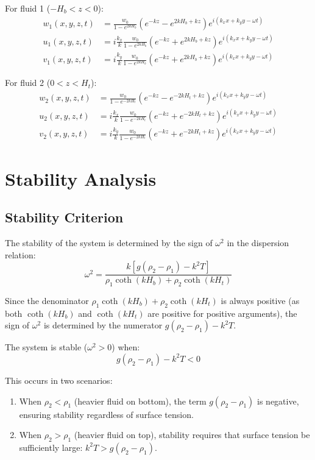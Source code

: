 \documentclass[12pt,a4paper]{article}
\begin{document}
For fluid 1 ($-H_b < z < 0$):
\begin{align}
w_1(x,y,z,t) &= \frac{w_0}{1 - e^{2kH_b}}(e^{-kz} - e^{2kH_b+kz})e^{i(k_xx + k_yy - \omega t)} \\
u_1(x,y,z,t) &= i\frac{k_x}{k}\frac{w_0}{1 - e^{2kH_b}}(e^{-kz} + e^{2kH_b+kz})e^{i(k_xx + k_yy - \omega t)} \\
v_1(x,y,z,t) &= i\frac{k_y}{k}\frac{w_0}{1 - e^{2kH_b}}(e^{-kz} + e^{2kH_b+kz})e^{i(k_xx + k_yy - \omega t)}
\end{align}

For fluid 2 ($0 < z < H_t$):
\begin{align}
w_2(x,y,z,t) &= \frac{w_0}{1 - e^{-2kH_t}}(e^{-kz} - e^{-2kH_t+kz})e^{i(k_xx + k_yy - \omega t)} \\
u_2(x,y,z,t) &= i\frac{k_x}{k}\frac{w_0}{1 - e^{-2kH_t}}(e^{-kz} + e^{-2kH_t+kz})e^{i(k_xx + k_yy - \omega t)} \\
v_2(x,y,z,t) &= i\frac{k_y}{k}\frac{w_0}{1 - e^{-2kH_t}}(e^{-kz} + e^{-2kH_t+kz})e^{i(k_xx + k_yy - \omega t)}
\end{align}

\section{Stability Analysis}
\subsection{Stability Criterion}
The stability of the system is determined by the sign of $\omega^2$ in the dispersion relation:
\begin{equation}
\omega^2 = \frac{k[g(\rho_2 - \rho_1) - k^2T]}{\rho_1\coth(kH_b) + \rho_2\coth(kH_t)}
\end{equation}

Since the denominator $\rho_1\coth(kH_b) + \rho_2\coth(kH_t)$ is always positive (as both $\coth(kH_b)$ and $\coth(kH_t)$ are positive for positive arguments), the sign of $\omega^2$ is determined by the numerator $g(\rho_2 - \rho_1) - k^2T$.

The system is stable ($\omega^2 > 0$) when:
\begin{equation}
g(\rho_2 - \rho_1) - k^2T < 0
\end{equation}

This occurs in two scenarios:
\begin{enumerate}
    \item When $\rho_2 < \rho_1$ (heavier fluid on bottom), the term $g(\rho_2 - \rho_1)$ is negative, ensuring stability regardless of surface tension.
    \item When $\rho_2 > \rho_1$ (heavier fluid on top), stability requires that surface tension be sufficiently large: $k^2T > g(\rho_2 - \rho_1)$.
\end{enumerate}
\end{document}
